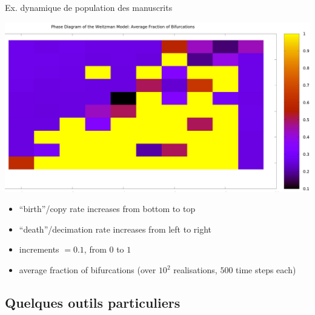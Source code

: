 \documentclass[ignorenonframetext]{beamer}
\begin{document}
\begin{frame}{Ex. dynamique de population des manuscrits}

\begin{block}{}
	\begin{center}
		\includegraphics[scale=0.25]{img/PhDg01.jpeg}
	\end{center}
\end{block}
\begin{block}{}
	\begin{itemize}
		\item ``birth''/copy rate increases from bottom to top
		\item ``death''/decimation rate increases from left to right
		\item increments $=0.1$, from $0$ to $1$
		\item average fraction of bifurcations (over $10^2$ realisations, $500$ time steps each)
	\end{itemize}
\end{block}
\end{frame}


\subsection{Quelques outils particuliers} %

\end{document}
